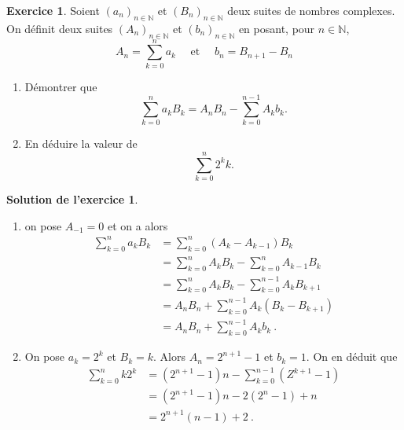 \documentclass[a4paper, 11pt,openany]{article}%
\theoremstyle{plain}
\theoremstyle{definition}
\newtheorem{exo}{Exercice}
\newtheorem{sol}{Solution de l'exercice}
\theoremstyle{remark}
\newcommand{\N}{\mathbb{N}}
\begin{document}
\begin{exo}
	Soient $(a_n)_{n\in \N}$ et $(B_n)_{n\in \N}$ deux suites de nombres complexes. On définit deux suites $(A_n)_{n\in \N}$ et $(b_n)_{n\in\N}$ en posant, pour $n\in \N$, 
	\[
		A_n = \sum_{k=0}^n a_k 
		\quad  \mbox{ et }\quad 
		b_n = B_{n+1} - B_n 
	\]
	\begin{enumerate}[label=\arabic*.]
		\item Démontrer que $$\sum_{k=0}^n a_kB_k = A_nB_n - \sum_{k=0}^{n-1}A_kb_k .$$
		\item En déduire la valeur de $$\sum_{k=0}^n 2^k k. $$
	\end{enumerate}
\end{exo}

\begin{sol}
	\begin{enumerate}
		\item on pose $A_{-1}=0$ et on a alors 
		\[
			\begin{aligned}
				\sum_{k=0}^n a_kB_k &= \sum_{k=0}^n (A_k-A_{k-1})B_k \\
				&= \sum_{k=0}^n A_kB_k - \sum_{k=0}^n A_{k-1}B_k \\
				&= \sum_{k=0}^n A_kB_k - \sum_{k=0}^{n-1} A_{k}B_{k+1} \\
				&= A_nB_n + \sum_{k=0}^{n-1} A_{k}(B_k - B_{k+1}) \\
				&= A_nB_n + \sum_{k=0}^{n-1} A_{k}b_k \ .
			\end{aligned}
		\]
		\item On pose $a_k = 2^k$ et $B_k = k$. Alors $A_n = 2^{n+1}-1$ et $b_k = 1$. On en déduit que 
		\[
			\begin{aligned}
				\sum_{k=0}^n k2^k 
				&= (2^{n+1}-1)n - \sum_{k=0}^{n-1}(Z^{k+1}-1) \\
				&= (2^{n+1}-1)n - 2(2^{n}-1) + n \\
				&= 2^{n+1}(n-1)+2 \ .
			\end{aligned}
		\]
	\end{enumerate}
\end{sol}
\end{document}
